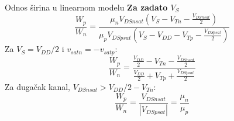 \begin{frame}[label=09_2-s045]{Odnos širina u linearnom modelu}
\textbf{Za zadato $V_S$}\[\frac{W_p}{W_n}=\frac{\mu_nV_{DSnsat}\left(V_S-V_{Tn}-\frac{V_{DSnsat}}2\right)}{\mu_pV_{DSpsat}\left(V_S-V_{DD}-V_{Tp}-\frac{V_{DSpsat}}2\right)}\]
Za $V_S=V_{DD}/2$ i $v_{satn}=-v_{satp}$:\[\frac{W_p}{W_n}=\frac{\frac{V_{DD}}2-V_{Tn}-\frac{V_{DSnsat}}2}{\frac{V_{DD}}2+V_{Tp}+\frac{V_{DSpsat}}2}\]
Za dugačak kanal, $V_{DSnsat}>V_{DD}/2-V_{Tn}$:\[\frac{W_p}{W_n}=\frac{V_{DSnsat}}{|V_{DSpsat}|}=\frac{\mu_n}{\mu_p}\]

\end{frame}
